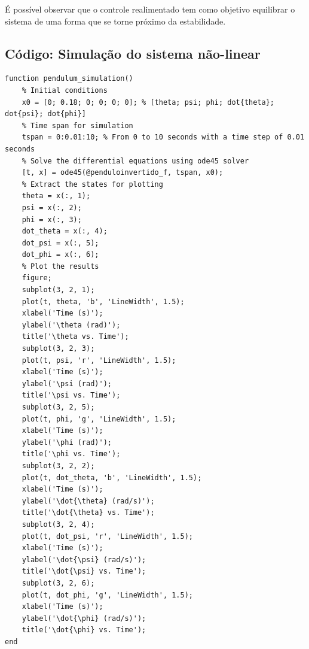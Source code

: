 \documentclass[10pt]{article}
\begin{document}
\quad É possível observar que o controle realimentado tem como objetivo equilibrar o sistema de uma forma que se torne próximo da estabilidade.

\newpage

\begin{appendices}

\section{Código: Simulação do sistema não-linear}

\begin{lstlisting}[caption={Código da simulação do sistema não-linear com ode45}, label=lst:pendulum_sim]
function pendulum_simulation()
    % Initial conditions
    x0 = [0; 0.18; 0; 0; 0; 0]; % [theta; psi; phi; dot{theta}; dot{psi}; dot{phi}]
    % Time span for simulation
    tspan = 0:0.01:10; % From 0 to 10 seconds with a time step of 0.01 seconds
    % Solve the differential equations using ode45 solver
    [t, x] = ode45(@penduloinvertido_f, tspan, x0);
    % Extract the states for plotting
    theta = x(:, 1);
    psi = x(:, 2);
    phi = x(:, 3);
    dot_theta = x(:, 4);
    dot_psi = x(:, 5);
    dot_phi = x(:, 6);
    % Plot the results
    figure;
    subplot(3, 2, 1);
    plot(t, theta, 'b', 'LineWidth', 1.5);
    xlabel('Time (s)');
    ylabel('\theta (rad)');
    title('\theta vs. Time');
    subplot(3, 2, 3);
    plot(t, psi, 'r', 'LineWidth', 1.5);
    xlabel('Time (s)');
    ylabel('\psi (rad)');
    title('\psi vs. Time');
    subplot(3, 2, 5);
    plot(t, phi, 'g', 'LineWidth', 1.5);
    xlabel('Time (s)');
    ylabel('\phi (rad)');
    title('\phi vs. Time');
    subplot(3, 2, 2);
    plot(t, dot_theta, 'b', 'LineWidth', 1.5);
    xlabel('Time (s)');
    ylabel('\dot{\theta} (rad/s)');
    title('\dot{\theta} vs. Time');
    subplot(3, 2, 4);
    plot(t, dot_psi, 'r', 'LineWidth', 1.5);
    xlabel('Time (s)');
    ylabel('\dot{\psi} (rad/s)');
    title('\dot{\psi} vs. Time');
    subplot(3, 2, 6);
    plot(t, dot_phi, 'g', 'LineWidth', 1.5);
    xlabel('Time (s)');
    ylabel('\dot{\phi} (rad/s)');
    title('\dot{\phi} vs. Time');
end


\end{lstlisting}
\end{appendices}
\end{document}
